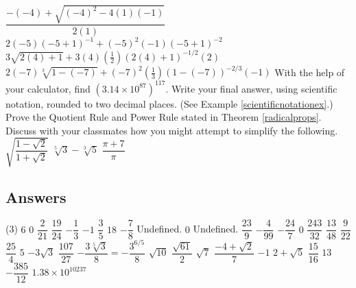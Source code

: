 \begin{tasks}
\task* $\dfrac{-(-4) + \sqrt{(-4)^2 - 4(1)(-1)}}{2(1)}$
\task* $2(-5)(-5+1)^{-1} + (-5)^2(-1)(-5+1)^{-2}$
\task* $3\sqrt{2(4)+1} + 3(4)\left(\frac{1}{2}\right)(2(4)+1)^{-1/2}(2)$
\task* $2(-7)\sqrt[3]{1-(-7)} + (-7)^2 \left(\frac{1}{3}\right)(1-(-7))^{-2/3}(-1)$ \label{arithexlast}
\task* With the help of your calculator, find $(3.14 \times 10^{87})^{117}$.  Write your final answer, using scientific notation, rounded to two decimal places. (See Example \ref{scientificnotationex}.)
\task* Prove the Quotient Rule and Power Rule stated in Theorem \ref{radicalprops}.
\task* Discuss with your classmates how you might attempt to simplify the following.
\task $\sqrt{\dfrac{1 - \sqrt{2}}{1 + \sqrt{2}}}$
\task $\sqrt[5]{3} - \sqrt[3]{5}$
\task $\dfrac{\pi + 7}{\pi}$
\end{tasks}

\newpage

\subsection{Answers}

\begin{tasks}(3)
\task $6$
\task $0$
\task  $\dfrac{2}{21}$
\task  $\dfrac{19}{24}$
\task  $-\dfrac{1}{3}$
\task  $-1$
\task  $\dfrac{3}{5}$
\task  $18$
\task  $-\dfrac{7}{8}$
\task  Undefined.
\task  $0$
\task  Undefined.
\task  $\dfrac{23}{9}$
\task  $-\dfrac{4}{99}$
\task  $-\dfrac{24}{7}$
\task  $0$
\task  $\dfrac{243}{32}$
\task  $\dfrac{13}{48}$
\task  $\dfrac{9}{22}$
\task  $\dfrac{25}{4}$
\task  $5$ 
\task  $-3\sqrt{3}$ 
\task  $\dfrac{107}{27}$
\task  $-\dfrac{3\sqrt[5]{3}}{8} = -\dfrac{3^{6/5}}{8}$
\task  $\sqrt{10}$
\task  $\dfrac{\sqrt{61}}{2}$ 
\task  $\sqrt{7}$
\task  $\dfrac{-4 + \sqrt{2}}{7}$
\task  $-1$
\task  $2 + \sqrt{5}$
\task $\dfrac{15}{16}$
\task $13$
\task $-\dfrac{385}{12}$
\task $1.38 \times 10^{10237}$
\end{tasks}